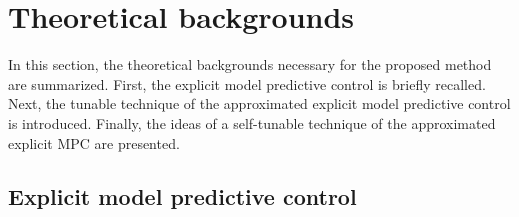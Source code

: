 \documentclass[preprint,12pt]{elsarticle}
\begin{document}
	\section{Theoretical backgrounds}
	\label{sec:preliminaries}
	
	In this section, the theoretical backgrounds necessary for the proposed method are summarized. First, the explicit model predictive control is briefly recalled. Next, the tunable technique of the approximated explicit model predictive control is introduced. Finally, the ideas of a self-tunable technique of the approximated explicit MPC are presented.
	
	\subsection{Explicit model predictive control}
	\label{sec:eMPC}
	
\end{document}
